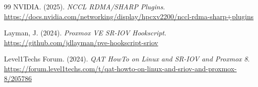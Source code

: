 \documentclass[10pt,letterpaper]{article}
\begin{document}
\begin{thebibliography}{99}
NVIDIA. (2025). \textit{NCCL RDMA/SHARP Plugins}. \url{https://docs.nvidia.com/networking/display/hpcxv2200/nccl-rdma-sharp+plugins}

Layman, J. (2024). \textit{Proxmox VE SR-IOV Hookscript}. \url{https://github.com/jdlayman/pve-hookscript-sriov}

Level1Techs Forum. (2024). \textit{QAT HowTo on Linux and SR-IOV and Proxmox 8}. \url{https://forum.level1techs.com/t/qat-howto-on-linux-and-sriov-and-proxmox-8/205786}

\end{thebibliography}
\end{document}
